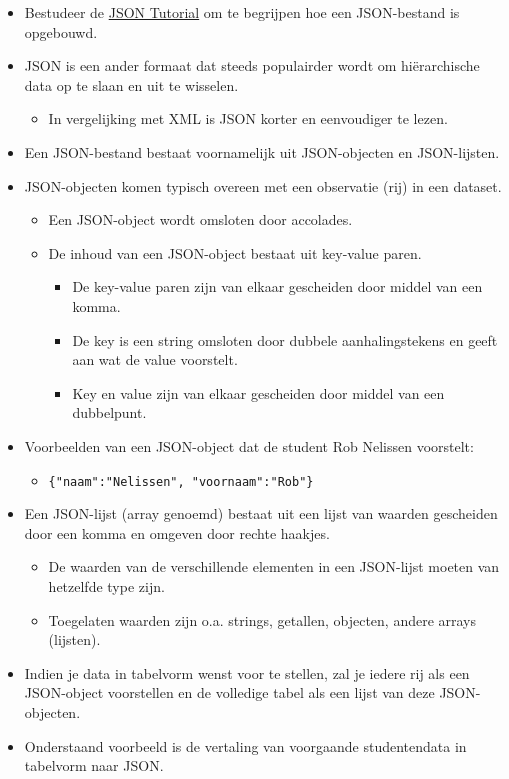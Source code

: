 \documentclass[]{memoir}
\providecommand{\tightlist}{%
  \setlength{\itemsep}{0pt}\setlength{\parskip}{0pt}}
\begin{document}
\begin{itemize}
\tightlist
\item
  Bestudeer de
  \href{http://beginnersbook.com/2015/04/json-tutorial/}{JSON Tutorial}
  om te begrijpen hoe een JSON-bestand is opgebouwd.
\item
  JSON is een ander formaat dat steeds populairder wordt om
  hiërarchische data op te slaan en uit te wisselen.

  \begin{itemize}
  \tightlist
  \item
    In vergelijking met XML is JSON korter en eenvoudiger te lezen.
  \end{itemize}
\item
  Een JSON-bestand bestaat voornamelijk uit JSON-objecten en
  JSON-lijsten.
\item
  JSON-objecten komen typisch overeen met een observatie (rij) in een
  dataset.

  \begin{itemize}
  \tightlist
  \item
    Een JSON-object wordt omsloten door accolades.
  \item
    De inhoud van een JSON-object bestaat uit key-value paren.

    \begin{itemize}
    \tightlist
    \item
      De key-value paren zijn van elkaar gescheiden door middel van een
      komma.
    \item
      De key is een string omsloten door dubbele aanhalingstekens en
      geeft aan wat de value voorstelt.
    \item
      Key en value zijn van elkaar gescheiden door middel van een
      dubbelpunt.
    \end{itemize}
  \end{itemize}
\item
  Voorbeelden van een JSON-object dat de student Rob Nelissen voorstelt:

  \begin{itemize}
  \tightlist
  \item
    \texttt{\{"naam":"Nelissen",\ "voornaam":"Rob"\}}
  \end{itemize}
\item
  Een JSON-lijst (array genoemd) bestaat uit een lijst van waarden
  gescheiden door een komma en omgeven door rechte haakjes.

  \begin{itemize}
  \tightlist
  \item
    De waarden van de verschillende elementen in een JSON-lijst moeten
    van hetzelfde type zijn.
  \item
    Toegelaten waarden zijn o.a. strings, getallen, objecten, andere
    arrays (lijsten).
  \end{itemize}
\item
  Indien je data in tabelvorm wenst voor te stellen, zal je iedere rij
  als een JSON-object voorstellen en de volledige tabel als een lijst
  van deze JSON-objecten.
\item
  Onderstaand voorbeeld is de vertaling van voorgaande studentendata in
  tabelvorm naar JSON.
\end{itemize}
\end{document}
